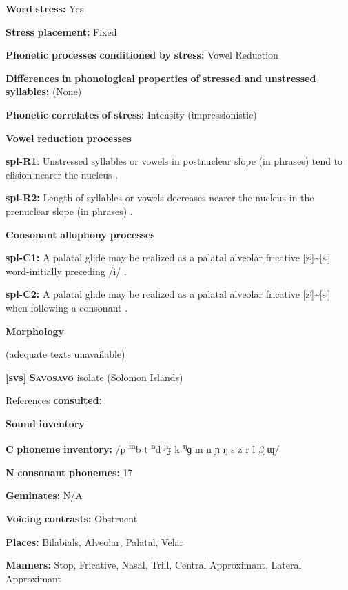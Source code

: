 \begin{styleBody}
\textbf{Word} \textbf{stress:} Yes

\textbf{Stress} \textbf{placement:} Fixed

\textbf{Phonetic} \textbf{processes} \textbf{conditioned} \textbf{by} \textbf{stress:} Vowel Reduction

\textbf{Differences} \textbf{in} \textbf{phonological} \textbf{properties} \textbf{of} \textbf{stressed} \textbf{and} \textbf{unstressed} \textbf{syllables:} (None)

\textbf{Phonetic} \textbf{correlates} \textbf{of} \textbf{stress:} Intensity (impressionistic)

\textbf{Vowel} \textbf{reduction} \textbf{processes}

\textbf{spl-R1}: Unstressed syllables or vowels in postnuclear slope (in phrases) tend to elision nearer the nucleus \citep[6]{McElhanon1970}.

\textbf{spl-R2:} Length of syllables or vowels decreases nearer the nucleus in the prenuclear slope (in phrases) \citep[6]{McElhanon1970}.

\textbf{Consonant} \textbf{allophony} \textbf{processes}

\textbf{spl-C1:} A palatal glide may be realized as a palatal alveolar fricative [zʲ]{\textasciitilde}[sʲ] word-initially preceding /i/ \citep{McElhanon1970}.

\textbf{spl-C2:} A palatal glide may be realized as a palatal alveolar fricative [zʲ]{\textasciitilde}[sʲ] when following a consonant \citep{McElhanon1970}.

\textbf{Morphology}

(adequate texts unavailable)

\textbf{[svs]}   \textbf{\textsc{Savosavo}}  isolate (Solomon Islands)

References \textbf{consulted:} \citet{Wegener2008}

\textbf{Sound} \textbf{inventory}

\textbf{C} \textbf{phoneme} \textbf{inventory:} /p \textsuperscript{m}b t \textsuperscript{n}d \textsuperscript{ɲ}ɟ k \textsuperscript{ŋ}ɡ m n ɲ ŋ s z r l $\beta ̞$ ɰ/

\textbf{N} \textbf{consonant} \textbf{phonemes:} 17

\textbf{Geminates:} N/A

\textbf{Voicing} \textbf{contrasts:} Obstruent

\textbf{Places:} Bilabials, Alveolar, Palatal, Velar

\textbf{Manners:} Stop, Fricative, Nasal, Trill, Central Approximant, Lateral Approximant


\end{styleBody}
